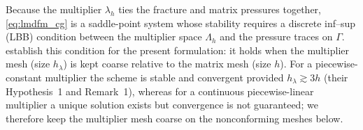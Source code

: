 \documentclass[a4paper,fleqn]{cas-sc}
\begin{document}
Because the multiplier \(\lambda_h\) ties the fracture and matrix
pressures together, \eqref{eq:lmdfm_cg} is a saddle-point system whose stability
requires a discrete inf--sup (LBB) condition between the multiplier space
\(\Lambda_h\) and the pressure traces on \(\Gamma\). \citet{Koeppel2019} establish
this condition for the present formulation: it holds when the multiplier mesh
(size \(h_\lambda\)) is kept coarse relative to the matrix mesh (size \(h\)). For a piecewise-constant
multiplier the scheme is stable and convergent provided \(h_\lambda\gtrsim 3h\)
(their Hypothesis~1 and Remark~1), whereas for a continuous piecewise-linear
multiplier a unique solution exists but convergence is not guaranteed; we
therefore keep the multiplier mesh coarse on the nonconforming meshes below.

\end{document}
